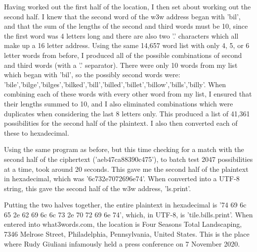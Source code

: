 \documentclass[a4paper, 11pt]{article}
\begin{document}
Having worked out the first half of the location, I then set about working out the second half. 
I knew that the second word of the w3w address began with 'bil', 
and that the sum of the lengths of the second and third words must be 10, 
since the first word was 4 letters long and there are also two '.' characters which all make up a 16 letter address. 
Using the same 14,657 word list with only 4, 5, or 6 letter words from before, I produced all of the possible combinations of second and third words (with a '.' separator). 
There were only 10 words from my list which began with 'bil', so the possibly second words were: 
'bile','bilge','bilges','bilked','bill','billed','billet','billow','bills','billy'. 
When combining each of these words with every other word from my list, I ensured that their lengths summed to 10, 
and I also eliminated combinations which were duplicates when considering the last 8 letters only. 
This produced a list of 41,361 possibilities for the second half of the plaintext. 
I also then converted each of these to hexadecimal. 

Using the same program as before, but this time checking for a match with the second half of the ciphertext ('aeb47ca88390c475'), 
to batch test 2047 possibilities at a time, took around 20 seconds. 
This gave me the second half of the plaintext in hexadecimal, which was '6c732e7072696e74'. 
When converted into a UTF-8 string, this gave the second half of the w3w address, 'ls.print'. 

Putting the two halves together, the entire plaintext in hexadecimal is '74 69 6c 65 2e 62 69 6c 6c 73 2e 70 72 69 6e 74', 
which, in UTF-8, is 'tile.bills.print'. 
When entered into what3words.com, the location is Four Seasons Total Landscaping, 7346 Melrose Street, Philadelphia, Pennsylvania, United States. 
This is the place where Rudy Giuliani infamously held a press conference on 7 November 2020.
\end{document}
